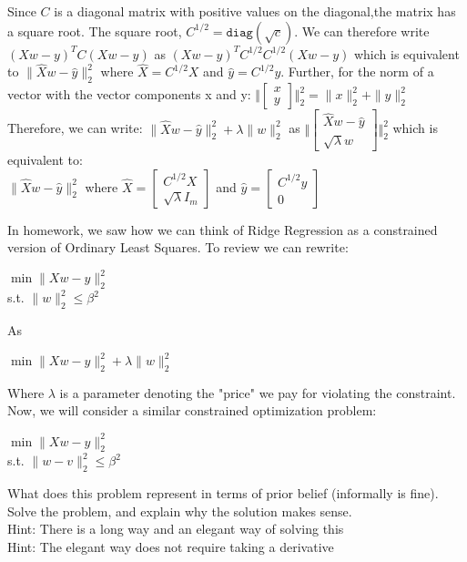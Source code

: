 \begin{Parts}
\begin{solution}
Since $C$ is a diagonal matrix with positive values on the diagonal,the matrix has a square root. The square root, $C^{1/2} = \texttt{diag}(\sqrt{c})$. We can therefore write $(Xw - y)^{T}C(Xw - y)$ as $(Xw - y)^{T}C^{1/2}C^{1/2}(Xw - y)$ which is equivalent to $\|\hat{X}w - \hat{y}\|_2^2$ where $\hat{X} = C^{1/2}X$ and $\hat{y} = C^{1/2}y$. Further, for the norm of a vector with the vector components x and y:
$\big\Vert \begin{bmatrix} x \\ y \end{bmatrix} \big\Vert_2^2 = \|x\|_2^2 + \|y\|_2^2 $ \\
Therefore, we can write:
$\|\hat{X}w - \hat{y}\|_2^2 + \lambda \|w\|_2^2$
as $\big\Vert \begin{bmatrix} \hat{X}w - \hat{y} \\ \sqrt{\lambda} w \end{bmatrix} \big\Vert_2^2$ which is equivalent to: \\
$\|\hat{X}w - \hat{y}\|_2^2$ where $\hat{X} = \begin{bmatrix} C^{1/2}X \\ \sqrt{\lambda }I_m \end{bmatrix}$ and $\hat{y} = \begin{bmatrix} C^{1/2}y \\ 0 \end{bmatrix}$
\end{solution}

\Part In homework, we saw how we can think of Ridge Regression as a constrained version of Ordinary Least Squares. To review we can rewrite:
\begin{center}
 $\min \|Xw - y\|_2^2$
 \\
 s.t. $\|w\|_2^2 \leq \beta^2$
 \\
\end{center}
As
\begin{center}
    $\min \|Xw - y\|_2^2 + \lambda \|w\|_2^2$\\
\end{center}
Where $\lambda$ is a parameter denoting the "price" we pay for violating the constraint.\\
Now, we will consider a similar constrained optimization problem:
\begin{center}
    $\min \|Xw -y\|_2^2$\\
    s.t. $\|w - v\|_2^2 \leq \beta^2$\\
\end{center}
What does this problem represent in terms of prior belief (informally is fine). Solve the problem, and explain why the solution makes sense.\\
Hint: There is a long way and an elegant way of solving this\\
Hint: The elegant way does not require taking a derivative


\end{Parts}

